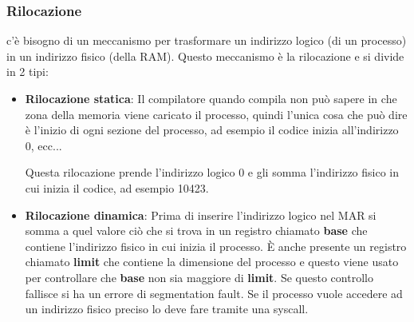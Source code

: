 \documentclass[a4paper]{article}
\theoremstyle{break}
\theoremstyle{break}
\theoremstyle{break}
\theoremstyle{break}
\begin{document}
\subsubsection{Rilocazione}
\begin{figure}[H]
  \centering
\end{figure}
c'è bisogno di un meccanismo per trasformare un indirizzo logico (di un processo) in
un indirizzo fisico (della RAM). Questo meccanismo è la rilocazione e si divide in 2
tipi:
\begin{itemize}
  \item \textbf{Rilocazione statica}:
    Il compilatore quando compila non può sapere in che zona della memoria viene
    caricato il processo, quindi l'unica cosa che può dire è l'inizio di ogni sezione
    del processo, ad esempio il codice inizia all'indirizzo 0, ecc...

    \noindent Questa rilocazione prende l'indirizzo logico 0 e gli somma l'indirizzo
    fisico in cui inizia il codice, ad esempio 10423. 

  \item \textbf{Rilocazione dinamica}:
    Prima di inserire l'indirizzo logico nel MAR si somma a quel valore ciò che si trova in un
    registro chiamato \textbf{base} che contiene l'indirizzo fisico in cui inizia il processo.
    È anche presente un registro chiamato \textbf{limit} che contiene la dimensione del processo
    e questo viene usato per controllare che \textbf{base} non sia maggiore di \textbf{limit}.
    Se questo controllo fallisce si ha un errore di segmentation fault. Se il processo
    vuole accedere ad un indirizzo fisico preciso lo deve fare tramite una syscall.
\end{itemize}
\end{document}
